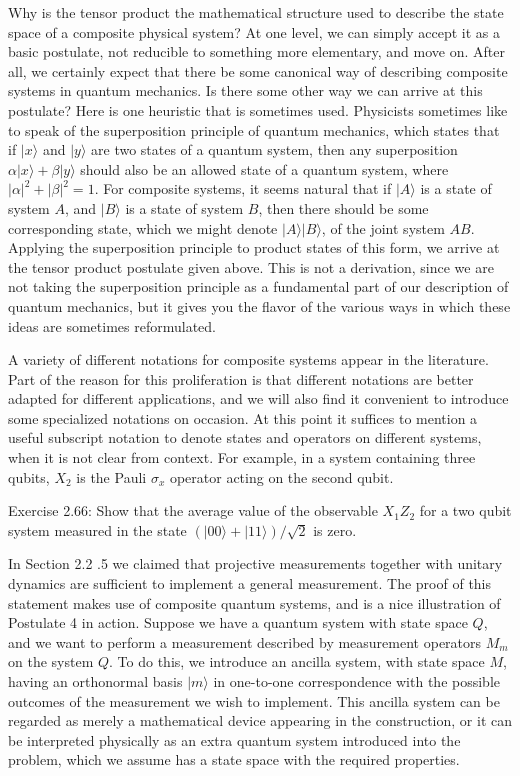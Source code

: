 \documentclass[10pt]{article}
\begin{document}
Why is the tensor product the mathematical structure used to describe the state space of a composite physical system? At one level, we can simply accept it as a basic postulate, not reducible to something more elementary, and move on. After all, we certainly expect that there be some canonical way of describing composite systems in quantum mechanics. Is there some other way we can arrive at this postulate? Here is one heuristic that is sometimes used. Physicists sometimes like to speak of the superposition principle of quantum mechanics, which states that if $|x\rangle$ and $|y\rangle$ are two states of a quantum system, then any superposition $\alpha|x\rangle+\beta|y\rangle$ should also be an allowed state of a quantum system, where $|\alpha|^{2}+|\beta|^{2}=1$. For composite systems, it seems natural that if $|A\rangle$ is a state of system $A$, and $|B\rangle$ is a state of system $B$, then there should be some corresponding state, which we might denote $|A\rangle|B\rangle$, of the joint system $A B$. Applying the superposition principle to product states of this form, we arrive at the tensor product postulate given above. This is not a derivation, since we are not taking the superposition principle as a fundamental part of our description of quantum mechanics, but it gives you the flavor of the various ways in which these ideas are sometimes reformulated.

A variety of different notations for composite systems appear in the literature. Part of the reason for this proliferation is that different notations are better adapted for different applications, and we will also find it convenient to introduce some specialized notations on occasion. At this point it suffices to mention a useful subscript notation to denote states and operators on different systems, when it is not clear from context. For example, in a system containing three qubits, $X_{2}$ is the Pauli $\sigma_{x}$ operator acting on the second qubit.

Exercise 2.66: Show that the average value of the observable $X_{1} Z_{2}$ for a two qubit system measured in the state $(|00\rangle+|11\rangle) / \sqrt{2}$ is zero.

In Section 2.2 .5 we claimed that projective measurements together with unitary dynamics are sufficient to implement a general measurement. The proof of this statement makes use of composite quantum systems, and is a nice illustration of Postulate 4 in action. Suppose we have a quantum system with state space $Q$, and we want to perform a measurement described by measurement operators $M_{m}$ on the system $Q$. To do this, we introduce an ancilla system, with state space $M$, having an orthonormal basis $|m\rangle$ in one-to-one correspondence with the possible outcomes of the measurement we wish to implement. This ancilla system can be regarded as merely a mathematical device appearing in the construction, or it can be interpreted physically as an extra quantum system introduced into the problem, which we assume has a state space with the required properties.
\end{document}
